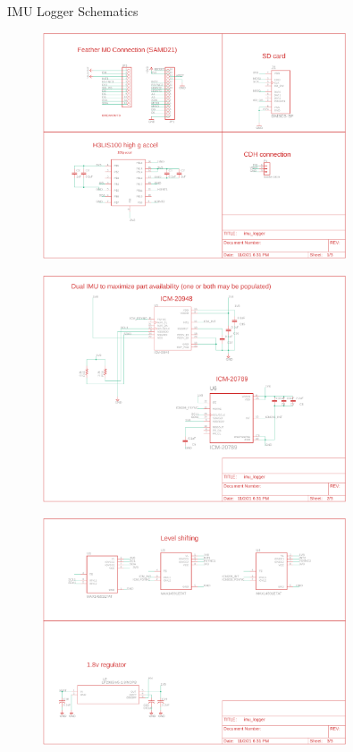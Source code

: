 \documentclass[UKenglish]{beamer}
\begin{document}
\begin{frame}[allowframebreaks]{IMU Logger Schematics}
\begin{figure}[H]
	\centering
	\includegraphics[width=0.8\textwidth]{images/imu_logger_schem_1}
	\label{fig:schematic-imu-p1}
\end{figure}
\begin{figure}[H]
	\centering
	\includegraphics[width=0.8\textwidth]{images/imu_logger_schem_2}
	\label{fig:schematic-imu-p2}
\end{figure}
\begin{figure}[H]
	\centering
	\includegraphics[width=0.8\textwidth]{images/imu_logger_schem_3}
	\label{fig:schematic-imu-p3}
\end{figure}
\end{frame}
\end{document}
